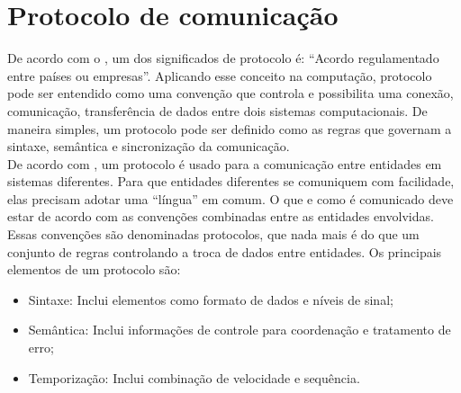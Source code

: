 \section{Protocolo de comunicação}
De acordo com o , um dos significados de protocolo é: 
``Acordo 
regulamentado entre países ou empresas''. Aplicando esse conceito na 
computação, protocolo pode ser entendido como uma convenção que controla e 
possibilita uma conexão, comunicação, transferência de dados entre dois 
sistemas computacionais. De maneira simples, um protocolo pode ser definido 
como as regras que governam a sintaxe, semântica e sincronização da 
comunicação.\\
De acordo com , um protocolo é usado para a 
comunicação entre entidades em sistemas diferentes. Para que entidades 
diferentes se comuniquem com facilidade, elas precisam adotar uma ``língua'' em 
comum. O que e como é comunicado deve estar de acordo com as convenções 
combinadas entre as entidades envolvidas. Essas convenções são denominadas 
protocolos, que nada mais é do que um conjunto de regras controlando a troca de 
dados entre entidades. Os principais elementos de um protocolo são:
\begin{itemize}
	\item Sintaxe: Inclui elementos como formato de dados e níveis de sinal;
	\item Semântica: Inclui informações de controle para coordenação e 
	tratamento de erro;
	\item Temporização: Inclui combinação de velocidade e sequência.
\end{itemize}
